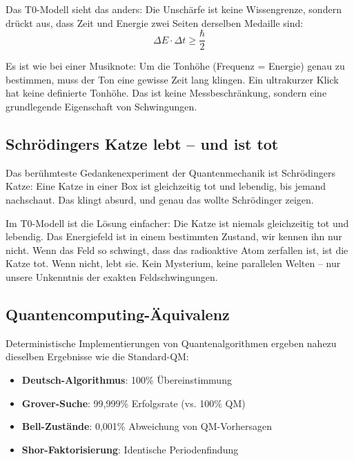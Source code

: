 	Das T0-Modell sieht das anders: Die Unschärfe ist keine Wissengrenze, sondern drückt aus, dass Zeit und Energie zwei Seiten derselben Medaille sind:
	\begin{equation}
		\Delta E \cdot \Delta t \geq \frac{\hbar}{2}
	\end{equation}
	
	Es ist wie bei einer Musiknote: Um die Tonhöhe (Frequenz = Energie) genau zu bestimmen, muss der Ton eine gewisse Zeit lang klingen. Ein ultrakurzer Klick hat keine definierte Tonhöhe. Das ist keine Messbeschränkung, sondern eine grundlegende Eigenschaft von Schwingungen.
	
	\subsection{Schrödingers Katze lebt -- und ist tot}
	
	Das berühmteste Gedankenexperiment der Quantenmechanik ist Schrödingers Katze: Eine Katze in einer Box ist gleichzeitig tot und lebendig, bis jemand nachschaut. Das klingt absurd, und genau das wollte Schrödinger zeigen.
	
	Im T0-Modell ist die Lösung einfacher: Die Katze ist niemals gleichzeitig tot und lebendig. Das Energiefeld ist in einem bestimmten Zustand, wir kennen ihn nur nicht. Wenn das Feld so schwingt, dass das radioaktive Atom zerfallen ist, ist die Katze tot. Wenn nicht, lebt sie. Kein Mysterium, keine parallelen Welten -- nur unsere Unkenntnis der exakten Feldschwingungen.
	
	\subsection{Quantencomputing-Äquivalenz}
	
	\begin{experimental}
		Deterministische Implementierungen von Quantenalgorithmen ergeben nahezu dieselben Ergebnisse wie die Standard-QM:
		\begin{itemize}
			\item \textbf{Deutsch-Algorithmus}: 100\% Übereinstimmung
			\item \textbf{Grover-Suche}: 99,999\% Erfolgsrate (vs. 100\% QM)
			\item \textbf{Bell-Zustände}: 0,001\% Abweichung von QM-Vorhersagen
			\item \textbf{Shor-Faktorisierung}: Identische Periodenfindung
		\end{itemize}
	\end{experimental}
	
